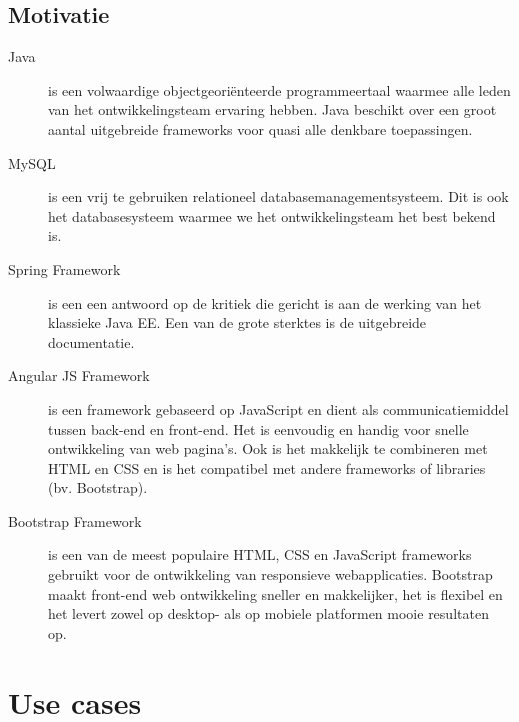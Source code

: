 \documentclass[a4paper]{article}
\begin{document}
\newpage
\subsection{Motivatie}
\begin{description}
    \item[Java] is een volwaardige objectgeoriënteerde programmeertaal waarmee alle leden van het ontwikkelingsteam ervaring hebben. Java beschikt over een groot aantal uitgebreide frameworks voor quasi alle denkbare toepassingen.
    \item[MySQL] is een vrij te gebruiken relationeel databasemanagementsysteem. Dit is ook het databasesysteem waarmee we het ontwikkelingsteam het best bekend is.
    \item[Spring Framework] is een een antwoord op de kritiek die gericht is aan de werking van het klassieke Java EE. Een van de grote sterktes is de uitgebreide documentatie.
    \item[Angular JS Framework] is een framework gebaseerd op JavaScript en dient als communicatiemiddel tussen back-end en front-end. Het is eenvoudig en handig voor snelle ontwikkeling van web pagina's. Ook is het makkelijk te combineren met HTML en CSS en is het compatibel met andere frameworks of libraries (bv. Bootstrap).
    \item[Bootstrap Framework] is een van de meest populaire HTML, CSS en JavaScript frameworks gebruikt voor de ontwikkeling van responsieve webapplicaties. Bootstrap maakt front-end web ontwikkeling sneller en makkelijker, het is flexibel en het levert zowel op desktop- als op mobiele platformen mooie resultaten op.
\end{description}

\clearpage
\section{Use cases} \label{sec:use_cases}



\end{document}
